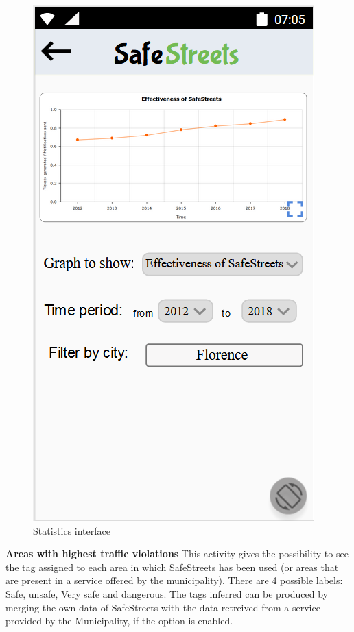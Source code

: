        \begin{figure}[h]
        \centering
        \includegraphics[scale=0.9]{Images/Statistics.png}
        \caption{Statistics interface}
    \end{figure}
    \newline\textbf{Areas with highest traffic violations}\newline
    This activity gives the possibility to see the tag assigned to each area in which SafeStreets has been used (or areas that are present in a service offered by the municipality). There are 4 possible labels: Safe, unsafe, Very safe and dangerous. The tags inferred can be produced by merging the own data of SafeStreets with the data retreived from a service provided by the Municipality, if the option is enabled.\newline 
